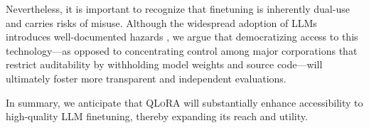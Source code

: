 Nevertheless, it is important to recognize that finetuning is inherently dual-use and carries risks of misuse. Although the widespread adoption of LLMs introduces well-documented hazards \citep{bommasani2021opportunities,bender2021dangers}, we argue that democratizing access to this technology—as opposed to concentrating control among major corporations that restrict auditability by withholding model weights and source code—will ultimately foster more transparent and independent evaluations.

In summary, we anticipate that \textsc{QLoRA} will substantially enhance accessibility to high-quality LLM finetuning, thereby expanding its reach and utility.